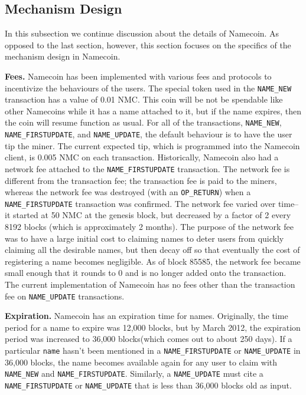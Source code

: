 \subsection{Mechanism Design}

In this subsection we continue discussion about the details of Namecoin. As opposed to the last section, however, this section focuses on the specifics of the mechanism design in Namecoin. 

{\bf Fees.}
Namecoin has been implemented with various fees and protocols to incentivize the behaviours of the users. The special token used in the {\tt NAME\_NEW} transaction has a value of 0.01 NMC. This coin will be not be spendable like other Namecoins while it has a name attached to it, but if the name expires, then the coin will resume function as usual. For all of the transactions, {\tt NAME\_NEW}, {\tt NAME\_FIRSTUPDATE}, and {\tt NAME\_UPDATE}, the default behaviour is to have the user tip the miner. The current expected tip, which is programmed into the Namecoin client, is 0.005 NMC on each transaction. Historically, Namecoin also had a network fee attached to the {\tt NAME\_FIRSTUPDATE} transaction. The network fee is different from the transaction fee; the transaction fee is paid to the miners, whereas the network fee was destroyed (with an {\tt OP\_RETURN}) when a {\tt NAME\_FIRSTUPDATE} transaction was confirmed. The network fee varied over time-- it started at 50 NMC at the genesis block, but decreased by a factor of 2 every 8192 blocks (which is approximately 2 months). The purpose of the network fee was to have a large initial cost to claiming names to deter users from quickly claiming all the desirable names, but then decay off so that eventually the cost of registering a name becomes negligible. As of block 85585, the network fee became small enough that it rounds to 0 and is no longer added onto the transaction. The current implementation of Namecoin has no fees other than the transaction fee on {\tt NAME\_UPDATE} transactions.

{\bf Expiration.}
Namecoin has an expiration time for names. Originally, the time period for a name to expire was 12,000 blocks, but by March 2012, the expiration period was increased to 36,000 blocks(which comes out to about 250 days). If a particular {\tt name} hasn't been mentioned in a {\tt NAME\_FIRSTUPDATE} or {\tt NAME\_UPDATE} in 36,000 blocks, the name becomes available again for any user to claim with {\tt NAME\_NEW} and {\tt NAME\_FIRSTUPDATE}. Similarly, a {\tt NAME\_UPDATE} must cite a {\tt NAME\_FIRSTUPDATE} or {\tt NAME\_UPDATE} that is less than 36,000 blocks old as input.

